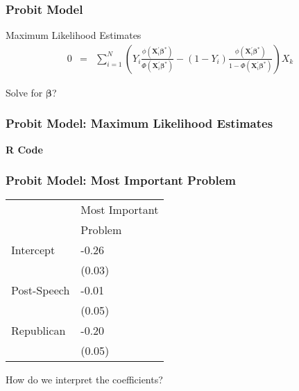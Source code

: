 \documentclass{beamer}
\begin{document}
\begin{frame}
\frametitle{Probit Model}

Maximum Likelihood Estimates
\begin{eqnarray}
0 &= & \sum_{i=1}^{N} \left(Y_{i} \frac{\phi(\boldsymbol{X}_{i}^{'} \boldsymbol{\beta}^{*})}{\Phi(\boldsymbol{X}_{i}^{'}\boldsymbol{\beta}^{*} )} - (1-Y_{i}) \frac{\phi(\boldsymbol{X}_{i}^{'} \boldsymbol{\beta}^{*} )}{1- \Phi(\boldsymbol{X}_{i}^{'}\boldsymbol{\beta}^{*})}\right)X_{k} \nonumber
\end{eqnarray}

Solve for $\boldsymbol{\beta}$?
\pause
{}
\end{frame}


\begin{frame}
\frametitle{Probit Model: Maximum Likelihood Estimates}

\textbf{R Code}


\end{frame}

\begin{frame}
\frametitle{Probit Model: Most Important Problem}

\begin{tabular}{ll}
	\hline
	& Most Important \\
	&  Problem \\
\hline
Intercept & -0.26  \\
		  & (0.03) \\
Post-Speech & -0.01 \\
			& (0.05) \\
Republican & -0.20 \\
			& (0.05) \\
\hline
\end{tabular}

How do we interpret the coefficients? \pause \\

\end{frame}
\end{document}
